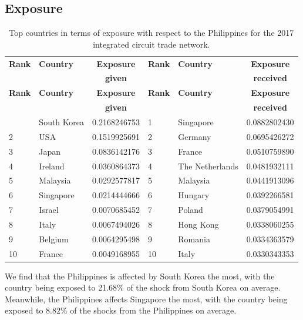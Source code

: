 \documentclass[12pt,letterpaper]{report}
\begin{document}
	\subsection{Exposure}
	\label{ssec:542exposure}
	
	\begin{longtable}{|l|l|r|l|l|r|}
		\caption{Top countries in terms of exposure with respect to the Philippines for the 2017 integrated circuit trade network. \label{tab:tab10Exposure2}} \\
		\hline
		\textbf{\small Rank} & \textbf{\small Country} & \multicolumn{1}{|c|}{\textbf{\small Exposure}} & \textbf{\small Rank} &
		\textbf{\small Country} & \multicolumn{1}{|c|}{\textbf{\small Exposure}} \\
		&  & \multicolumn{1}{|c|}{\textbf{\small given}} & & & \multicolumn{1}{|c|}{\textbf{\small received}} \\  
		\hline
		\endfirsthead
		\hline
		\textbf{\small Rank} & \textbf{\small Country} & \multicolumn{1}{|c|}{\textbf{\small Exposure}} & \textbf{\small Rank} &
		\textbf{\small Country} & \multicolumn{1}{|c|}{\textbf{\small Exposure}} \\
		&  & \multicolumn{1}{|c|}{\textbf{\small given}} & & & \multicolumn{1}{|c|}{\textbf{\small received}} \\  
		\hline
		\endhead
		\hline
		\endfoot
		1 & South Korea & 0.2168246753 & 1 & Singapore & 0.0882802430 \\
		2 & USA & 0.1519925691 & 2 & Germany & 0.0695426272 \\
		3 & Japan & 0.0836142176 & 3 & France & 0.0510759890 \\
		4 & Ireland & 0.0360864373 & 4 & The Netherlands & 0.0481932111 \\
		5 & Malaysia & 0.0292577817 & 5 & Malaysia & 0.0441913096 \\
		6 & Singapore & 0.0214444666 & 6 & Hungary & 0.0392266581 \\
		7 & Israel & 0.0070685452 & 7 & Poland & 0.0379054991 \\
		8 & Italy & 0.0067494026 & 8 & Hong Kong & 0.0338060255\\
		9 & Belgium & 0.0064295498 & 9 & Romania & 0.0334363579 \\
		10 & France & 0.0049168955 & 10 & Italy & 0.0330343353 \\
	\end{longtable}
	
	We find that the Philippines is affected by South Korea the most, with the country being exposed to 21.68\% of the shock from South Korea on average. Meanwhile, the Philippines affects Singapore the most, with the country being exposed to 8.82\% of the shocks from the Philippines on average.
	
\end{document}
